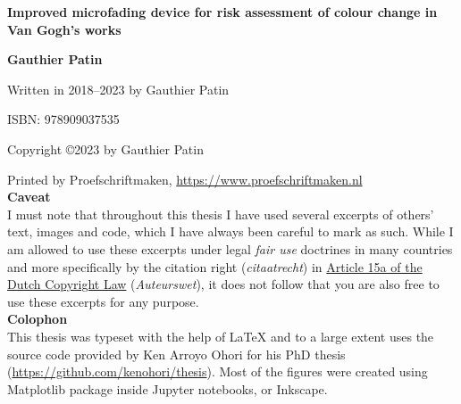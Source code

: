 


\begin{titlepage}
   \begin{center}
       \vspace*{4cm}

       \textbf{\Huge Improved microfading device for risk assessment of colour change in Van Gogh's works}

           
       \vspace{7cm}

       \textbf{\Large Gauthier Patin}          
  
            
   \end{center}
\end{titlepage}








\clearpage
\thispagestyle{empty}
\null%
\label{thesis:colophon}
\vfill
{}
Written in 2018--2023 by Gauthier Patin 

ISBN: 978909037535

Copyright \copyright \hspace{0.1cm}2023 by Gauthier Patin

Printed by Proefschriftmaken, \url{https://www.proefschriftmaken.nl}\\


\textbf{Caveat} \\
I must note that throughout this thesis I have used several excerpts of others' text, images and code, which I have always been careful to mark as such.
While I am allowed to use these excerpts under legal \emph{fair use} doctrines in many countries and more specifically by the citation right (\emph{citaatrecht}) in \href{http://wetten.overheid.nl/jci1.3:c:BWBR0001886&hoofdstuk=I&paragraaf=6&artikel=15a&z=2015-07-01&g=2015-07-01}{Article 15a of the Dutch Copyright Law} (\emph{Auteurswet}), it does not follow that you are also free to use these excerpts for any purpose.\\

\textbf{Colophon} \\
This thesis was typeset with the help of \LaTeX{} and to a large extent uses the source code provided by Ken Arroyo Ohori for his PhD thesis (\url{https://github.com/kenohori/thesis}). Most of the figures were created using Matplotlib package inside Jupyter notebooks, or Inkscape.

